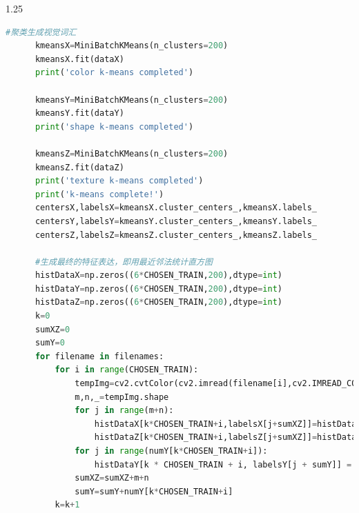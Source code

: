\documentclass[supercite]{HustGraduPaper}
\begin{document}
\begin{sloppypar}
\begin{appendices}
\begin{spacing}{1.25}
\begin{lstlisting}[language=python]
      #聚类生成视觉词汇
      kmeansX=MiniBatchKMeans(n_clusters=200)
      kmeansX.fit(dataX)
      print('color k-means completed')
      
      kmeansY=MiniBatchKMeans(n_clusters=200)
      kmeansY.fit(dataY)
      print('shape k-means completed')
      
      kmeansZ=MiniBatchKMeans(n_clusters=200)
      kmeansZ.fit(dataZ)
      print('texture k-means completed')
      print('k-means complete!')
      centersX,labelsX=kmeansX.cluster_centers_,kmeansX.labels_
      centersY,labelsY=kmeansY.cluster_centers_,kmeansY.labels_
      centersZ,labelsZ=kmeansZ.cluster_centers_,kmeansZ.labels_
      
      #生成最终的特征表达，即用最近邻法统计直方图
      histDataX=np.zeros((6*CHOSEN_TRAIN,200),dtype=int)
      histDataY=np.zeros((6*CHOSEN_TRAIN,200),dtype=int)
      histDataZ=np.zeros((6*CHOSEN_TRAIN,200),dtype=int)
      k=0
      sumXZ=0
      sumY=0
      for filename in filenames:
          for i in range(CHOSEN_TRAIN):
              tempImg=cv2.cvtColor(cv2.imread(filename[i],cv2.IMREAD_COLOR),cv2.COLOR_BGR2HSV)        #m,n,_=tempImg.shape
              m,n,_=tempImg.shape
              for j in range(m+n):
                  histDataX[k*CHOSEN_TRAIN+i,labelsX[j+sumXZ]]=histDataX[k*CHOSEN_TRAIN+i,labelsX[j+sumXZ]]+1
                  histDataZ[k*CHOSEN_TRAIN+i,labelsZ[j+sumXZ]]=histDataZ[k*CHOSEN_TRAIN+i,labelsZ[j+sumXZ]]+1
              for j in range(numY[k*CHOSEN_TRAIN+i]):
                  histDataY[k * CHOSEN_TRAIN + i, labelsY[j + sumY]] = histDataY[k * CHOSEN_TRAIN + i, labelsY[j + sumY]] + 1
              sumXZ=sumXZ+m+n
              sumY=sumY+numY[k*CHOSEN_TRAIN+i]
          k=k+1
      

\end{lstlisting}
\end{spacing}
\end{appendices}
\end{sloppypar}
\end{document}
